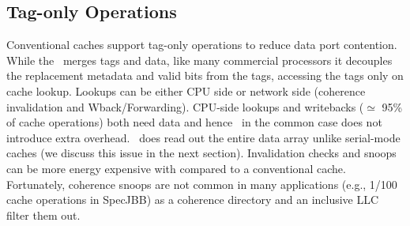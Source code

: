\subsection{Tag-only Operations}  Conventional caches support tag-only operations to reduce data port contention. While the \AC\ merges tags and data, like many commercial processors it decouples the replacement metadata and valid bits from the tags, accessing the tags only on cache lookup. Lookups can be either CPU side or network side (coherence invalidation and Wback/Forwarding). CPU-side lookups and writebacks ($\simeq$ 95\% of cache operations) both need data and hence \AC\ in the common case does not introduce extra overhead. \AC\ does read out the entire data array unlike serial-mode caches (we discuss this issue in the next section). Invalidation checks and snoops can be more energy expensive with \AC{} compared to a conventional cache. Fortunately, coherence snoops are not common in many applications (e.g., 1/100 cache operations in SpecJBB) as a coherence directory and an inclusive LLC filter them out.




